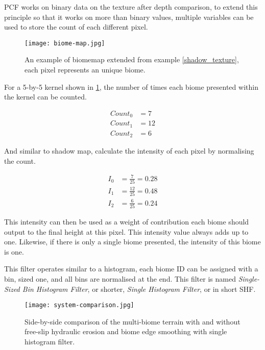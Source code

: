 \documentclass[oneside, a4paper]{report}
\begin{document}
    PCF works on binary data on the texture after depth comparison, to extend this principle so that it works on more than binary values, multiple variables can be used to store the count of each different pixel.

    \begin{figure}[H]
        \center
        \texttt{[image: biome-map.jpg]}
        \caption{An example of biomemap extended from example \ref{shadow_texture}, each pixel represents an unique biome.}
        \label{biome_map}
    \end{figure}

    For a 5-by-5 kernel shown in \ref{biome_map}, the number of times each biome presented within the kernel can be counted.

    \begin{align*}
        Count_{0} &= 7 \\
        Count_{1} &= 12 \\
        Count_{2} &= 6
    \end{align*}

    And similar to shadow map, calculate the intensity of each pixel by normalising the count.

    \begin{align*}
        I_{0} &= \frac{7}{25} = 0.28 \\
        I_{1} &= \frac{12}{25} = 0.48 \\
        I_{2} &= \frac{6}{25} = 0.24
    \end{align*}

    This intensity can then be used as a weight of contribution each biome should output to the final height at this pixel. This intensity value always adds up to one. Likewise, if there is only a single biome presented, the intensity of this biome is one.

    This filter operates similar to a histogram, each biome ID can be assigned with a bin, sized one, and all bins are normalised at the end. This filter is named \textit{Single-Sized Bin Histogram Filter}, or shorter, \textit{Single Histogram Filter}, or in short SHF.

    \begin{figure}[H]
        \texttt{[image: system-comparison.jpg]}
        \caption{Side-by-side comparison of the multi-biome terrain with and without free-slip hydraulic erosion and biome edge smoothing with single histogram filter.}
    \end{figure}
\end{document}
